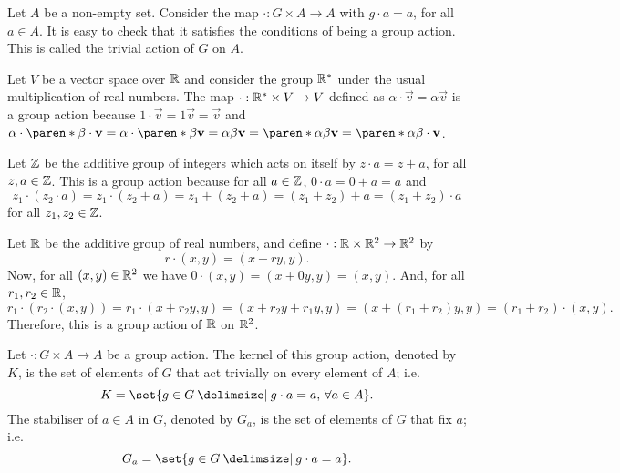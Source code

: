 \documentclass[11pt]{penrose}
\begin{document}
\begin{negg}
    Let $A$ be a non-empty set. Consider the map $\cdot : G \times A \to A$ with $g \cdot a = a$, for all $a \in A$. It is easy to check that it satisfies the conditions of being a group action. This is called the trivial action of $G$ on $A$.
\end{negg}

\begin{negg}
    Let $V$ be a vector space over $\mathbb{R}$ and consider the group $\mathbb{R}^{*}$ under the usual multiplication of real numbers. The map $\cdot : \mathbb{R}^{*} \times V \to V$ defined as $\alpha \cdot \vec{v} = \alpha \vec{v}$ is a group action because $1 \cdot \vec{v} = 1\vec{v} = \vec{v}$ and $\alpha \cdot \paren*{ \beta \cdot \vec{v} } = \alpha \cdot \paren*{ \beta\vec{v} } = \alpha\beta\vec{v} = \paren*{\alpha\beta} \vec{v} = \paren*{\alpha\beta} \cdot \vec{v}$.
\end{negg}

\begin{negg}
    Let $\mathbb{Z}$ be the additive group of integers which acts on itself by $z \cdot a = z + a$, for all $z, a \in \mathbb{Z}$. This is a group action because for all $a \in \mathbb{Z}$, $0 \cdot a = 0 + a = a$ and
    \begin{equation*}
        z_{1} \cdot (z_{2} \cdot a)
        = z_{1} \cdot (z_{2} + a)
        = z_{1} + (z_{2} + a)
        = (z_{1} + z_{2}) + a
        = (z_{1} + z_{2}) \cdot a
    \end{equation*}
    for all $z_{1}, z_{2} \in \mathbb{Z}$.
\end{negg}

\begin{negg}
    Let $\mathbb{R}$ be the additive group of real numbers, and define $\cdot : \mathbb{R} \times \mathbb{R}^{2} \to \mathbb{R}^{2}$ by
    \begin{equation*}
        r \cdot (x,y) = (x + ry, y).
    \end{equation*}
    Now, for all $(x,y) \in \mathbb{R}^{2}$ we have $0 \cdot (x,y) = (x + 0y, y) = (x, y)$. And, for all $r_{1}, r_{2} \in \mathbb{R}$,
    \begin{equation*}
        r_{1} \cdot (r_{2} \cdot (x,y))
        = r_{1} \cdot (x + r_{2}y, y)
        = (x + r_{2}y + r_{1}y, y)
        = (x + (r_{1} + r_{2})y, y)
        = (r_{1} + r_{2}) \cdot (x, y).
    \end{equation*}
    Therefore, this is a group action of $\mathbb{R}$ on $\mathbb{R}^{2}$.
\end{negg}

\begin{ndfn}
    Let $\cdot : G \times A \to A$ be a group action. The kernel of this group action, denoted by $K$, is the set of elements of $G$ that act trivially on every element of $A$; i.e.
    \begin{equation*}
        K = \set{g \in G \st g \cdot a = a, \, \forall a \in A}.
    \end{equation*}
    The stabiliser of $a \in A$ in $G$, denoted by $G_{a}$, is the set of elements of $G$ that fix $a$; i.e.
    \begin{equation*}
        G_{a} = \set{g \in G \st g \cdot a = a}.
    \end{equation*}
\end{ndfn}
\end{document}
